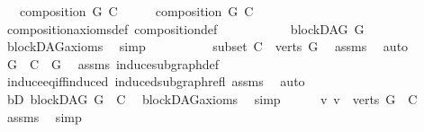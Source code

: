 \begin{isabellebody}
\ \ \ {\isachardoublequoteopen}composition\ G\ C{\isachardoublequoteclose}\isanewline
%
\isadelimproof
%
\endisadelimproof
%
\isatagproof
{}\isamarkupfalse%
\ {\isacharminus}{\kern0pt}\isanewline
\ \ \isamarkupfalse%
\ {\isachardoublequoteopen}composition\ G\ C{\isachardoublequoteclose}\isanewline
\ \ \ \ \isamarkupfalse%
\ composition{\isacharunderscore}{\kern0pt}axioms{\isacharunderscore}{\kern0pt}def\ composition{\isacharunderscore}{\kern0pt}def\isanewline
\ \ \isamarkupfalse%
\ \ \isanewline
\ \ \ \ \isamarkupfalse%
\ {\isachardoublequoteopen}blockDAG\ G{\isachardoublequoteclose}\ \isamarkupfalse%
\ blockDAG{\isacharunderscore}{\kern0pt}axioms\ \isamarkupfalse%
\ simp\isanewline
\ \ \isamarkupfalse%
\ \isanewline
\ \ \ \ \isamarkupfalse%
\ subset{\isacharcolon}{\kern0pt}\ {\isachardoublequoteopen}C\ {\isasymsubseteq}\ verts\ G{\isachardoublequoteclose}\ \isamarkupfalse%
\ assms\ \isamarkupfalse%
\ auto\isanewline
\ \ \ \ \isamarkupfalse%
\ \isamarkupfalse%
\ {\isachardoublequoteopen}G\ {\isasymrestriction}\ C\ {\isacharequal}{\kern0pt}\ G{\isachardoublequoteclose}\ \isamarkupfalse%
\ assms\ induce{\isacharunderscore}{\kern0pt}subgraph{\isacharunderscore}{\kern0pt}def\isanewline
\ \ \ \ \ \ \isamarkupfalse%
\ induce{\isacharunderscore}{\kern0pt}eq{\isacharunderscore}{\kern0pt}iff{\isacharunderscore}{\kern0pt}induced\ induced{\isacharunderscore}{\kern0pt}subgraph{\isacharunderscore}{\kern0pt}refl\ assms\ \isamarkupfalse%
\ auto\ \isanewline
\ \ \ \ \isamarkupfalse%
\ \isamarkupfalse%
\ bD{\isacharcolon}{\kern0pt}\ {\isachardoublequoteopen}blockDAG\ {\isacharparenleft}{\kern0pt}G\ {\isasymrestriction}\ C{\isacharparenright}{\kern0pt}{\isachardoublequoteclose}\ \isamarkupfalse%
\ blockDAG{\isacharunderscore}{\kern0pt}axioms\ \isamarkupfalse%
\ simp\isanewline
\ \ \ \ \isamarkupfalse%
\ {\isachardoublequoteopen}{\isasymnexists}v{\isachardot}{\kern0pt}\ v\ {\isasymin}\ {\isacharparenleft}{\kern0pt}verts\ G{\isacharparenright}{\kern0pt}\ {\isacharminus}{\kern0pt}\ C{\isachardoublequoteclose}\ \isamarkupfalse%
\ assms\ \isamarkupfalse%
\ simp\isanewline
\ \ \ \ \isamarkupfalse%
\ \isamarkupfalse%

\end{isabellebody}
